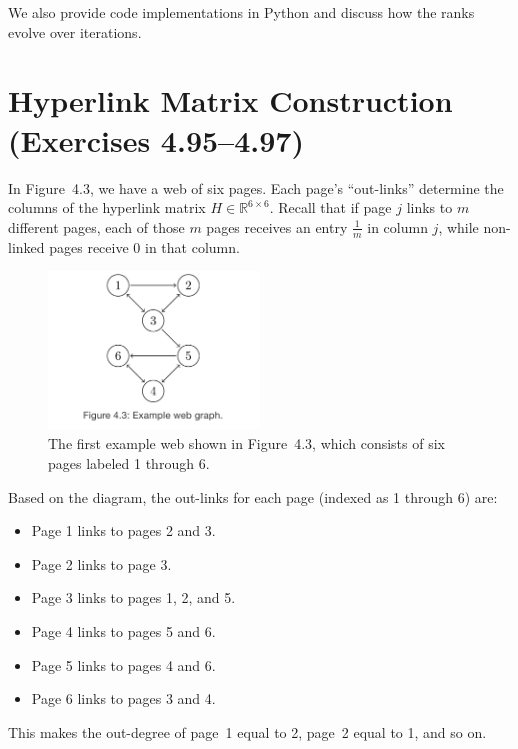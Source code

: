\documentclass{article}
\begin{document}
We also provide code implementations in Python and discuss how the ranks evolve over iterations.

\section{Hyperlink Matrix Construction (Exercises 4.95--4.97)}

In Figure~4.3, we have a web of six pages. Each page's ``out-links'' determine the columns of the hyperlink matrix 
$H \in \mathbb{R}^{6 \times 6}$. Recall that if page $j$ links to $m$ different pages, each of those $m$ pages 
receives an entry $\tfrac{1}{m}$ in column $j$, while non-linked pages receive $0$ in that column.

\begin{figure}[h]
  \centering
  \includegraphics[width=0.5\textwidth]{img/Node_Tree_4.3.png}
  \caption{%
    The first example web shown in Figure~4.3, which consists of six pages labeled 1 through 6.
  }
  \label{fig:Node_Tree_4.3}
\end{figure}

Based on the diagram, the out-links for each page (indexed as 1 through 6) are:
\begin{itemize}
  \item Page 1 links to pages 2 and 3.
  \item Page 2 links to page 3.
  \item Page 3 links to pages 1, 2, and 5.
  \item Page 4 links to pages 5 and 6.
  \item Page 5 links to pages 4 and 6.
  \item Page 6 links to pages 3 and 4.
\end{itemize}
This makes the out-degree of page~1 equal to 2, page~2 equal to 1, and so on.

\bigskip
\end{document}
